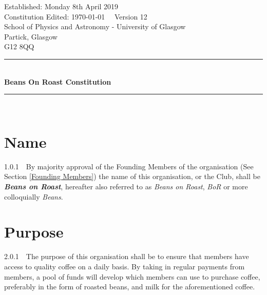 \documentclass[a4paper,11pt]{article}
\begin{document}
\begin{titlepage} %
\begin{center} %

Established: Monday 8th April 2019\\
Constitution Edited: \today $\quad$ Version 12\\[1cm]

School of Physics and Astronomy - University of Glasgow\\
Partick, Glasgow\\
G12 8QQ\\[4mm] %
\rule[0.4cm]{15cm}{.2pt}\\ %
{\Huge \textbf{Beans On Roast Constitution}}
\rule[0.4cm]{15cm}{.2pt}\\ %
\end{center}

\centering
{}

\tableofcontents

\end{titlepage}



\section{Name}
\label{Name}
1.0.1$\quad$By majority approval of the Founding Members of the organisation (See Section \ref{Founding Members}) the name of this organisation, or the Club, shall be \textit{\textbf{Beans on Roast}}, hereafter also referred to as \textit{Beans on Roast}, \textit{BoR} or more colloquially \textit{Beans}.
\section{Purpose}
\label{Purpose}
2.0.1$\quad$The purpose of this organisation shall be to ensure that members have access to quality coffee on a daily basis. By taking in regular payments from members, a pool of funds will develop which members can use to purchase coffee, preferably in the form of roasted beans, and milk for the aforementioned coffee. \\
\end{document}
